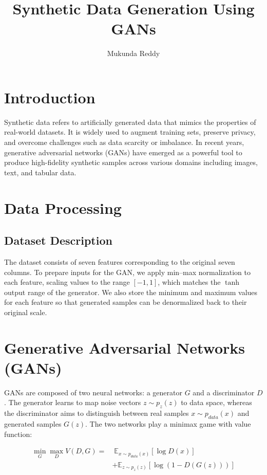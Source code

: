 \documentclass[12pt, a4paper, twocolumn]{article}
\title{Synthetic Data Generation Using GANs}
\author{Mukunda Reddy}
\date{}
\begin{document}
\maketitle

\section{Introduction}
Synthetic data refers to artificially generated data that mimics the properties of real-world datasets. It is widely used to augment training sets, preserve privacy, and overcome challenges such as data scarcity or imbalance. In recent years, generative adversarial networks (GANs) have emerged as a powerful tool to produce high-fidelity synthetic samples across various domains including images, text, and tabular data.

\section{Data Processing}
\subsection{Dataset Description}
The dataset consists of seven features corresponding to the original seven columns. To prepare inputs for the GAN, we apply min–max normalization to each feature, scaling values to the range $[-1,1]$, which matches the $\tanh$ output range of the generator. We also store the minimum and maximum values for each feature so that generated samples can be denormalized back to their original scale.

\section{Generative Adversarial Networks (GANs)}
GANs are composed of two neural networks: a generator $G$ and a discriminator $D$. The generator learns to map noise vectors $z \sim p_z(z)$ to data space, whereas the discriminator aims to distinguish between real samples $x \sim p_{data}(x)$ and generated samples $G(z)$. The two networks play a minimax game with value function:

\begin{equation}
\begin{aligned}
\min_G \max_D V(D, G) = &\; \mathbb{E}_{x \sim p_{data}(x)}[\log D(x)] \\
& + \mathbb{E}_{z \sim p_z(z)}[\log(1 - D(G(z)))]
\end{aligned}
\end{equation}
\end{document}
